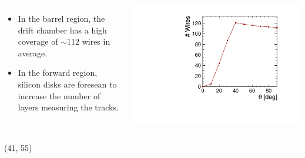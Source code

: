 \documentclass[final,xcolor={dvipsnames,svgnames,x11names,table}]{beamer}
\begin{document}
\begin{frame}
\begin{textblock}{40}
\begin{tcolorbox}[title=The parameters of the drift chamber]
\begin{columns}
      \begin{itemize}
        \item In the barrel region, the drift chamber has a high coverage of $\sim 112$ wires in average.
        \item In the forward region, silicon disks are foresean to increase the number of layers measuring the tracks.
      \end{itemize}
      \centering
      \includegraphics[width=\textwidth]{Figures/numWires}
  \end{columns}

  \end{tcolorbox}
\end{textblock}


\begin{textblock}{40}(41, 55)
  \begin{tcolorbox}[title=Main sources of beam-induced backgrounds]


\end{tcolorbox}
\end{textblock}
\end{frame}
\end{document}
